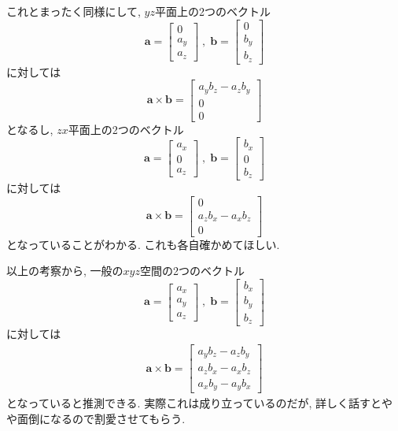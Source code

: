 これとまったく同様にして, $yz$平面上の2つのベクトル
$$
\bm{a} = \left[
 \begin{array}{c}
  0 \\ 
  a_y \\
  a_z
 \end{array}
\right]
\; , \; 
\bm{b} = \left[
 \begin{array}{c}
  0 \\ 
  b_y \\
  b_z
 \end{array}
\right]
$$
に対しては
$$
\bm{a} \times \bm{b} = \left[
 \begin{array}{c}
  a_y b_z - a_z b_y \\
  0 \\
  0
 \end{array}
\right]
$$
となるし, $zx$平面上の2つのベクトル
$$
\bm{a} = \left[
 \begin{array}{c}
  a_x \\ 
  0 \\
  a_z
 \end{array}
\right]
\; , \; 
\bm{b} = \left[
 \begin{array}{c}
  b_x \\ 
  0 \\
  b_z
 \end{array}
\right]
$$
に対しては
$$
\bm{a} \times \bm{b} = \left[
 \begin{array}{c}
  0 \\
  a_z b_x - a_x b_z \\
  0
 \end{array}
\right]
$$
となっていることがわかる. これも各自確かめてほしい. 

以上の考察から, 一般の$xyz$空間の2つのベクトル
$$
\bm{a} = \left[
 \begin{array}{c}
  a_x \\ 
  a_y \\
  a_z
 \end{array}
\right]
\; , \; 
\bm{b} = \left[
 \begin{array}{c}
  b_x \\ 
  b_y \\
  b_z
 \end{array}
\right]
$$
に対しては
\begin{eqnarray}
\bm{a} \times \bm{b} = \left[
 \begin{array}{c}
a_y b_z - a_z b_y \\
a_z b_x - a_x b_z \\
a_x b_y - a_y b_x
\end{array}
\right]
\label{eq:gaisekiseibun}
\end{eqnarray}
となっていると推測できる. 実際これは成り立っているのだが, 詳しく話すとやや面倒になるので割愛させてもらう. 

